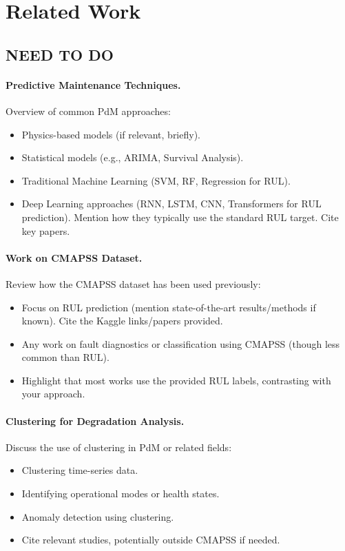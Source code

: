 \section{Related Work}
\label{sec:related_work}



\subsection{NEED TO DO}
\paragraph{Predictive Maintenance Techniques.}
Overview of common PdM approaches:
\begin{itemize}
    \item Physics-based models (if relevant, briefly).
    \item Statistical models (e.g., ARIMA, Survival Analysis).
    \item Traditional Machine Learning (SVM, RF, Regression for RUL).
    \item Deep Learning approaches (RNN, LSTM, CNN, Transformers for RUL prediction). Mention how they typically use the standard RUL target. Cite key papers.
\end{itemize}

\paragraph{Work on CMAPSS Dataset.}
Review how the CMAPSS dataset has been used previously:
\begin{itemize}
    \item Focus on RUL prediction (mention state-of-the-art results/methods if known). Cite the Kaggle links/papers provided.
    \item Any work on fault diagnostics or classification using CMAPSS (though less common than RUL).
    \item Highlight that most works use the provided RUL labels, contrasting with your approach.
\end{itemize}

\paragraph{Clustering for Degradation Analysis.}
Discuss the use of clustering in PdM or related fields:
\begin{itemize}
    \item Clustering time-series data.
    \item Identifying operational modes or health states.
    \item Anomaly detection using clustering.
    \item Cite relevant studies, potentially outside CMAPSS if needed.
\end{itemize}

